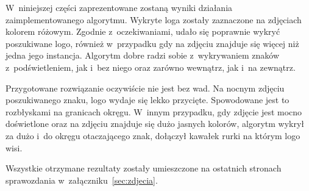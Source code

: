 W~niniejszej części zaprezentowane zostaną wyniki działania zaimplementowanego algorytmu. Wykryte loga zostały zaznaczone na zdjęciach kolorem różowym. Zgodnie z~oczekiwaniami, udało się poprawnie wykryć poszukiwane logo, również w~przypadku gdy na zdjęciu znajduje się więcej niż jedna jego instancja. Algorytm dobre radzi sobie z~wykrywaniem znaków z~podświetleniem, jak i~bez niego oraz zarówno wewnątrz, jak i~na zewnątrz. 

Przygotowane rozwiązanie oczywiście nie jest bez wad. Na nocnym zdjęciu poszukiwanego znaku, logo wydaje się lekko przycięte. Spowodowane jest to rozbłyskami na granicach okręgu. W~innym przypadku, gdy zdjęcie jest mocno doświetlone oraz na zdjęciu znajduje się dużo jasnych kolorów, algorytm wykrył za dużo i~do okręgu otaczającego znak, dołączył kawałek rurki na którym logo wisi. 

Wszystkie otrzymane rezultaty zostały umieszczone na ostatnich stronach sprawozdania w~załączniku~\ref{sec:zdjecia}.
